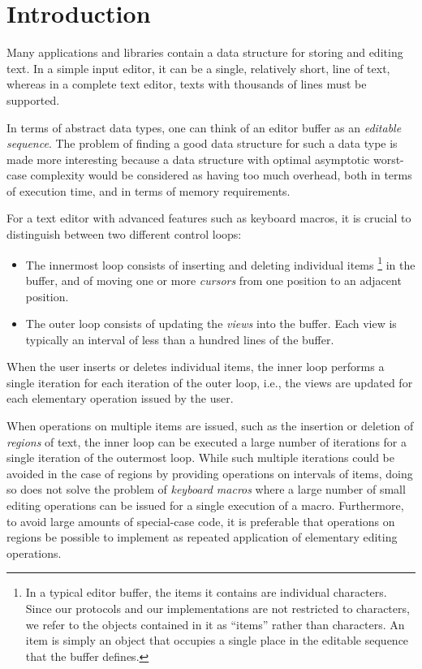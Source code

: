 \section{Introduction}
\label{sec-introduction}

Many applications and libraries contain a data structure for storing
and editing text.  In a simple input editor, it can be a single,
relatively short, line of text, whereas in a complete text editor,
texts with thousands of lines must be supported.

In terms of abstract data types, one can think of an editor buffer as
an \emph{editable sequence}.  The problem of finding a good data
structure for such a data type is made more interesting because a data
structure with optimal asymptotic worst-case complexity would be
considered as having too much overhead, both in terms of execution
time, and in terms of memory requirements.

For a text editor with advanced features such as keyboard macros, it
is crucial to distinguish between two different control loops:

\begin{itemize}
\item The innermost loop consists of inserting and deleting individual
  items%
\footnote{In a typical editor buffer, the items it contains are
  individual characters.  Since our protocols and our implementations
  are not restricted to characters, we refer to the objects contained
  in it as ``items'' rather than characters.  An item is simply an
  object that occupies a single place in the editable sequence that
  the buffer defines.}
in the buffer, and of moving one or
  more \emph{cursors} from one position to an adjacent position.
\item The outer loop consists of updating the \emph{views} into the
  buffer.  Each view is typically an interval of less than a
  hundred lines of the buffer.
\end{itemize}

When the user inserts or deletes individual items, the inner loop
performs a single iteration for each iteration of the outer loop,
i.e., the views are updated for each elementary operation issued by
the user.

When operations on multiple items are issued, such as the insertion or
deletion of \emph{regions} of text, the inner loop can be executed a
large number of iterations for a single iteration of the outermost
loop.  While such multiple iterations could be avoided in the case of
regions by providing operations on intervals of items, doing so does
not solve the problem of \emph{keyboard macros} where a large number
of small editing operations can be issued for a single execution of a
macro.  Furthermore, to avoid large amounts of special-case code, it
is preferable that operations on regions be possible to implement as
repeated application of elementary editing operations.

